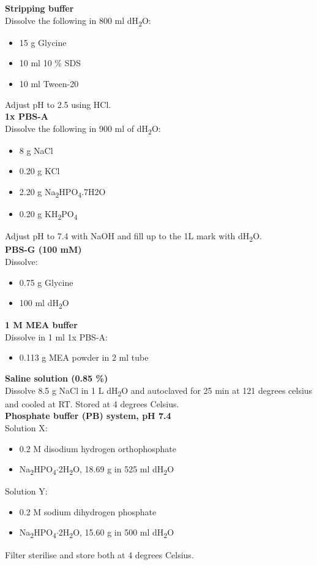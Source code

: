 \noindent
\textbf{Stripping buffer} \\
Dissolve the following in 800 ml dH\textsubscript{2}O:
\begin{itemize}
\item 15 g Glycine
\item 10 ml 10 \% SDS 
\item 10 ml Tween-20
\end{itemize}
Adjust pH to 2.5 using HCl. \\
 
\noindent
\textbf{1x PBS-A} \\
Dissolve the following in 900 ml of dH\textsubscript{2}O:
\begin{itemize}
\item 8 g NaCl 
\item 0.20 g KCl 
\item 2.20 g Na\textsubscript{2}HPO\textsubscript{4}.7H2O
\item 0.20 g KH\textsubscript{2}PO\textsubscript{4} 
\end{itemize}
Adjust pH to 7.4 with NaOH and fill up to the 1L mark with dH\textsubscript{2}O.\\

\noindent
\textbf{PBS-G (100 mM)} \\
Dissolve:
\begin{itemize}
\item 0.75 g Glycine 
\item 100 ml dH\textsubscript{2}O
\end{itemize}

\noindent
\textbf{1 M MEA buffer} \\
Dissolve in 1 ml 1x PBS-A:
\begin{itemize}
\item 0.113 g MEA powder in 2 ml tube
\end{itemize}

\noindent
\textbf{Saline solution (0.85 \%)} \\
Dissolve 8.5 g NaCl in 1 L dH\textsubscript{2}O and autoclaved for 25 min at 121 degrees celsius and cooled at RT.
Stored at 4 degrees Celsius. \\

\noindent
\textbf{Phosphate buffer (PB) system, pH 7.4} \\
Solution X:
\begin{itemize}
\item 0.2 M disodium hydrogen orthophosphate 
\item Na\textsubscript{2}HPO\textsubscript{4}$\cdot$2H\textsubscript{2}O, 18.69 g in 525 ml dH\textsubscript{2}O 
\end{itemize}
Solution Y:
\begin{itemize}
\item 0.2 M sodium dihydrogen phosphate 
\item Na\textsubscript{2}HPO\textsubscript{4}$\cdot$2H\textsubscript{2}O, 15.60 g in 500 ml dH\textsubscript{2}O 
\end{itemize}
Filter sterilise and store both at 4 degrees Celsius. \\

